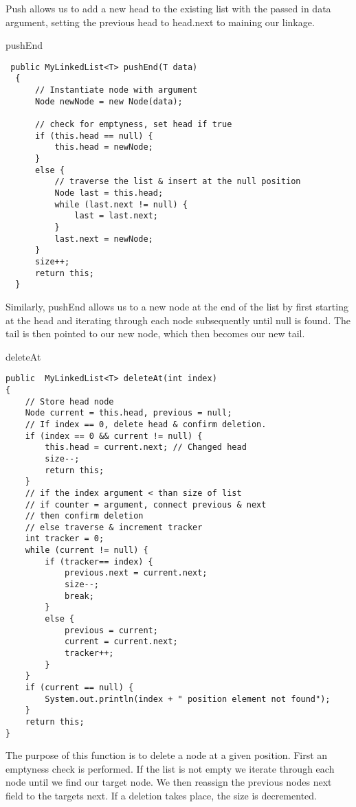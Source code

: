 \documentclass[a4paper]{article}
\begin{document}
Push allows us to add a new head to the existing list 
with the passed in data argument, setting the previous head 
to head.next to maining our linkage.

\newpage



\begin{algorithm}
\caption{pushEnd}\label{euclid}

\begin{verbatim}
 public MyLinkedList<T> pushEnd(T data)
  {
      // Instantiate node with argument
      Node newNode = new Node(data);
       
      // check for emptyness, set head if true
      if (this.head == null) {
          this.head = newNode;
      }
      else {
          // traverse the list & insert at the null position
          Node last = this.head;
          while (last.next != null) {
              last = last.next;
          }
          last.next = newNode;
      }
      size++;
      return this;
  }
\end{verbatim}

\end{algorithm}


Similarly, pushEnd allows us to a new node at the end of the list by first starting 
at the head and iterating through each node subsequently until null is found. 
The tail is then pointed to our new node, which then becomes our new tail.
\newpage


\vspace*{0pt}
\begin{algorithm}
\caption{deleteAt}\label{euclid}

\begin{verbatim}
public  MyLinkedList<T> deleteAt(int index)
{
    // Store head node
    Node current = this.head, previous = null;
    // If index == 0, delete head & confirm deletion.
    if (index == 0 && current != null) {
        this.head = current.next; // Changed head
        size--;
        return this;
    }
    // if the index argument < than size of list
    // if counter = argument, connect previous & next
    // then confirm deletion
    // else traverse & increment tracker
    int tracker = 0;
    while (current != null) {
        if (tracker== index) {
            previous.next = current.next;
            size--;
            break;
        }
        else {
            previous = current;
            current = current.next;
            tracker++;
        }
    }
    if (current == null) {
        System.out.println(index + " position element not found");
    }
    return this;
}
\end{verbatim}
\end{algorithm}
The purpose of this function is to delete a node at a given position.
First an emptyness check is performed. If the list is not empty
we iterate through each node until we find our target node. 
We then reassign the previous nodes next field to the targets next.
If a deletion takes place, the size is decremented. \\
\end{document}
